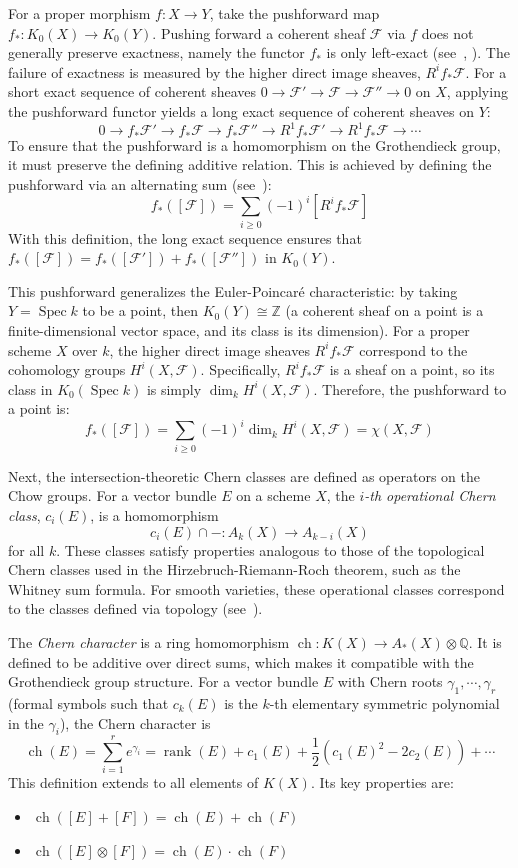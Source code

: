 \documentclass{ut-thesis}
\newcommand{\Q}{{\mathbb{Q}}}
\newcommand{\Z}{{\mathbb{Z}}}
\newcommand{\CF}{{\mathcal{F}}}
\newcommand{\ch}{{\operatorname{ch}}}
\newcommand{\Spec}{{\operatorname{Spec}}}
\renewcommand{\ch}{{\operatorname{ch}}}
\begin{document}
For a proper morphism $f: X \to Y$, take the pushforward map $f_*: K_0(X) \to K_0(Y)$. Pushing forward a
coherent sheaf $\CF$ via $f$ does not generally preserve exactness, namely the functor $f_*$ is only left-exact (see~\cite{hartshorneAlgebraicGeometry2013}, \cite{NateAlgGeo}). The
failure of exactness is measured by the higher direct image sheaves, $R^i f_* \CF$. For a short exact sequence
of coherent sheaves $0 \to \CF' \to \CF \to \CF'' \to 0$ on $X$, applying the pushforward functor yields a
long exact sequence of coherent sheaves on $Y$:
\[
0 \to f_*\CF' \to f_*\CF \to f_*\CF'' \to R^1f_*\CF' \to R^1f_*\CF \to \cdots
\]
To ensure that the pushforward is a homomorphism on the Grothendieck group, it must preserve the defining
additive relation. This is achieved by defining the pushforward via an alternating sum
(see~\cite{hartshorneAlgebraicGeometry2013}):
\[
f_*([\CF]) = \sum_{i \ge 0} (-1)^i [R^i f_* \CF]
\]
With this definition, the long exact sequence ensures that $f_*([\CF]) = f_*([\CF']) + f_*([\CF''])$ in $K_0(Y)$.

This pushforward generalizes the Euler-Poincar\'e characteristic: by taking $Y = \Spec k$ to be a point, then
$K_0(Y) \cong \Z$ (a coherent sheaf on a point is a finite-dimensional vector space, and its class is its
dimension). For a proper scheme $X$ over $k$, the higher direct image sheaves $R^i f_* \CF$ correspond to the
cohomology groups $H^i(X, \CF)$. Specifically, $R^i f_* \CF$ is a sheaf on a point, so its class in $K_0(\Spec
k)$ is simply $\dim_k H^i(X, \CF)$. Therefore, the pushforward to a point is:
\[
f_*([\CF]) = \sum_{i \ge 0} (-1)^i \dim_k H^i(X, \CF) = \chi(X, \CF)
\]

Next, the intersection-theoretic Chern classes are defined as operators on the Chow groups. For a vector bundle $E$
on a scheme $X$, the \emph{$i$-th operational Chern class}, $c_i(E)$, is a homomorphism
\[
c_i(E) \cap - : A_k(X) \to A_{k-i}(X)
\]
for all $k$. These classes satisfy properties analogous to those of the topological Chern classes used in the
Hirzebruch-Riemann-Roch theorem, such as the Whitney sum formula. For smooth varieties, these operational
classes correspond to the classes defined via topology
(see~\cite{fultonIntersectionTheory1984}).

The \emph{Chern character} is a ring homomorphism $\ch: K(X) \to A_*(X) \otimes \Q$. It is defined to be
additive over direct sums, which makes it compatible with the Grothendieck group structure. For a vector
bundle $E$ with Chern roots $\gamma_1, \cdots, \gamma_r$ (formal symbols such that $c_k(E)$ is the $k$-th
elementary symmetric polynomial in the $\gamma_i$), the Chern character is
\[
\ch(E) = \sum_{i=1}^r e^{\gamma_i} = \operatorname{rank}(E) + c_1(E) + \frac{1}{2}(c_1(E)^2 - 2c_2(E)) + \cdots
\]
This definition extends to all elements of $K(X)$. Its key properties are:
\begin{itemize}
    \item $\ch([E] + [F]) = \ch(E) + \ch(F)$
    \item $\ch([E] \otimes [F]) = \ch(E) \cdot \ch(F)$
\end{itemize}
\end{document}

